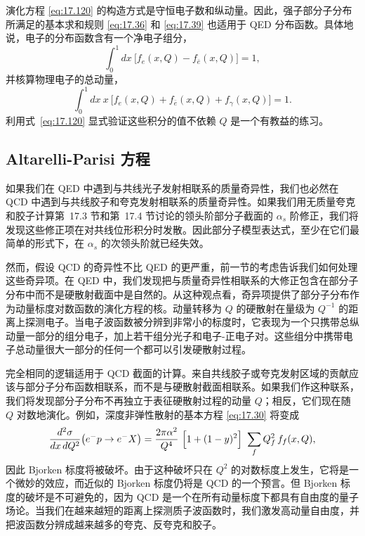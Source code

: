 演化方程 \eqref{eq:17.120} 的构造方式是守恒电子数和纵动量。因此，强子部分子分布所满足的基本求和规则 \eqref{eq:17.36} 和 \eqref{eq:17.39} 也适用于 QED 分布函数。具体地说，电子的分布函数含有一个净电子组分，
\begin{equation}
  \int_0^1 dx\ \bigl[ f_e(x,Q) - f_{\bar{e}}(x,Q) \bigr] = 1 ,
  \label{eq:17.123}
\end{equation}
并核算物理电子的总动量，
\begin{equation}
  \int_0^1 dx\ x\ \bigl[ f_e(x,Q) + f_{\bar{e}}(x,Q) + f_\gamma(x,Q) \bigr]
  = 1 .
  \label{eq:17.124}
\end{equation}
利用式~\eqref{eq:17.120} 显式验证这些积分的值不依赖 $Q$ 是一个有教益的练习。

\subsection{Altarelli-Parisi 方程}

如果我们在 QED 中遇到与共线光子发射相联系的质量奇异性，我们也必然在 QCD 中遇到与共线胶子和夸克发射相联系的质量奇异性。如果我们用无质量夸克和胶子计算第~17.3 节和第~17.4 节讨论的领头阶部分子截面的 $\alpha_s$ 阶修正，我们将发现这些修正项在对共线位形积分时发散。因此部分子模型表达式，至少在它们最简单的形式下，在 $\alpha_s$ 的次领头阶就已经失效。

然而，假设 QCD 的奇异性不比 QED 的更严重，前一节的考虑告诉我们如何处理这些奇异项。在 QED 中，我们发现把与质量奇异性相联系的大修正包含在部分子分布中而不是硬散射截面中是自然的。从这种观点看，奇异项提供了部分子分布作为动量标度对数函数的演化方程的核。动量转移为 $Q$ 的硬散射在量级为 $Q^{-1}$ 的距离上探测电子。当电子波函数被分辨到非常小的标度时，它表现为一个只携带总纵动量一部分的组分电子，加上若干组分光子和电子-正电子对。这些组分中携带电子总动量很大一部分的任何一个都可以引发硬散射过程。

完全相同的逻辑适用于 QCD 截面的计算。来自共线胶子或夸克发射区域的贡献应该与部分子分布函数相联系，而不是与硬散射截面相联系。如果我们作这种联系，我们将发现部分子分布不再独立于表征硬散射过程的动量 $Q$；相反，它们现在随 $Q$ 对数地演化。例如，深度非弹性散射的基本方程 \eqref{eq:17.30} 将变成
\begin{equation}
  \frac{d^2\sigma}{dx\,dQ^2}\bigl( e^{-}p \to e^{-}X \bigr)
  = \frac{2\pi\alpha^2}{Q^4}\ \Bigl[ 1 + (1-y)^2 \Bigr]\ \sum_f Q_f^2\,
    f_f(x, Q) ,
  \label{eq:17.125}
\end{equation}
因此 Bjorken 标度将被破坏。由于这种破坏只在 $Q^2$ 的对数标度上发生，它将是一个微妙的效应，而近似的 Bjorken 标度仍将是 QCD 的一个预言。但 Bjorken 标度的破坏是不可避免的，因为 QCD 是一个在所有动量标度下都具有自由度的量子场论。当我们在越来越短的距离上探测质子波函数时，我们激发高动量自由度，并把波函数分辨成越来越多的夸克、反夸克和胶子。

